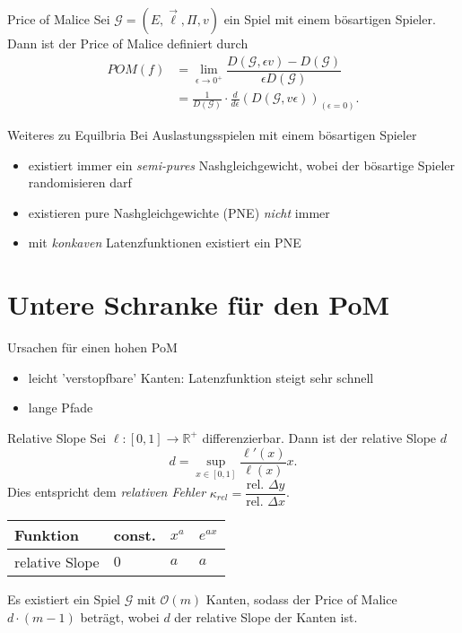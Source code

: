 \documentclass{beamer}
\begin{document}
\begin{frame}{Price of Malice}
	Sei $\mathcal G = (E, \vec{\ell}, \Pi, v)$ ein Spiel mit einem bösartigen Spieler.
	Dann ist der \alert{Price of Malice} definiert durch
	\begin{align*}
		POM(f) &= \lim_{\epsilon \to 0^+} \dfrac{D(\mathcal G, \epsilon v) - D(\mathcal G)}{\epsilon D(\mathcal G)}  \\
		&= \frac{1}{D(\mathcal G)} \cdot \frac{d}{d \epsilon}(D(\mathcal G, v \epsilon))_{(\epsilon = 0)}.
	\end{align*}
\end{frame}

\begin{frame}{Weiteres zu Equilbria}
	Bei Auslastungsspielen mit einem bösartigen Spieler 
	\begin{itemize}
		\item existiert immer ein \emph{semi-pures} Nashgleichgewicht, wobei der bösartige Spieler randomisieren darf
		\item existieren pure Nashgleichgewichte (PNE) \emph{nicht} immer
		\item mit \emph{konkaven} Latenzfunktionen existiert ein PNE
	\end{itemize}
\end{frame}

\section{Untere Schranke für den PoM}

\begin{frame}{Ursachen für einen hohen PoM}
	\begin{itemize}
		\item leicht 'verstopfbare' Kanten: Latenzfunktion steigt sehr schnell
		\item lange Pfade
	\end{itemize}
\end{frame}

\begin{frame}{Relative Slope}
	Sei $\ell : [0,1] \to \mathbb R^+$ differenzierbar.
	Dann ist der \alert{relative Slope} $d$
	\[ d = \sup_{x \in [0,1]} \dfrac{\ell'(x)}{\ell(x)} x .\]
	Dies entspricht dem \emph{relativen Fehler} $\kappa_{rel} = \dfrac{\text{rel. } \Delta y}{\text{rel. } \Delta x}$.
	
	\begin{table}[]
		\begin{tabular}{@{}llll@{}}
			\toprule
			Funktion       & const. & $x^a$ & $e^{ax}$ \\ \midrule
			relative Slope & $0$      & $a$     & $a$        \\ \bottomrule
		\end{tabular}
	\end{table}
	\begin{theorem}
		Es existiert ein Spiel $\mathcal G$ mit $\mathcal O(m)$ Kanten, sodass der Price of Malice $d \cdot (m-1)$ beträgt, wobei $d$ der relative Slope der Kanten ist.
	\end{theorem}
\end{frame}
\end{document}
